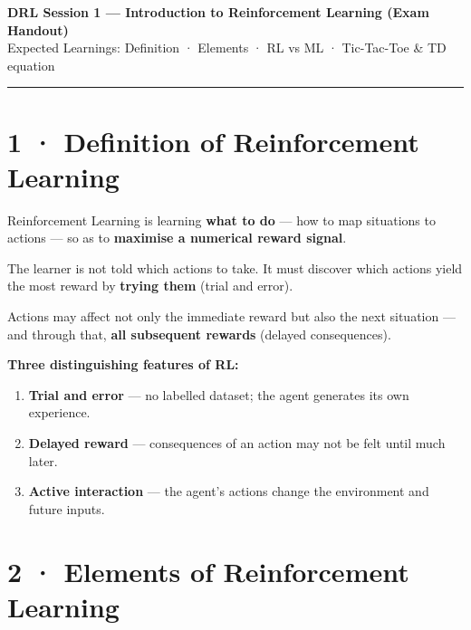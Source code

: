 \documentclass[11pt,a4paper]{article}
\begin{document}
\begin{center}
  {\large\bfseries DRL Session 1 — Introduction to Reinforcement Learning (Exam Handout)}\\[2pt]
  {\small Expected Learnings: Definition · Elements · RL vs ML · Tic-Tac-Toe \& TD equation}
\end{center}
\hrule\vspace{6pt}

\section*{1 · Definition of Reinforcement Learning}

\begin{tcolorbox}[defn={Formal Definition (Sutton \& Barto)}]
Reinforcement Learning is learning \textbf{what to do} — how to map situations to actions —
so as to \textbf{maximise a numerical reward signal}.

\medskip
The learner is not told which actions to take. It must discover which actions yield the most
reward by \textbf{trying them} (trial and error).

\medskip
Actions may affect not only the immediate reward but also the next situation — and through that,
\textbf{all subsequent rewards} (delayed consequences).
\end{tcolorbox}

\textbf{Three distinguishing features of RL:}
\begin{enumerate}
  \item \textbf{Trial and error} — no labelled dataset; the agent generates its own experience.
  \item \textbf{Delayed reward} — consequences of an action may not be felt until much later.
  \item \textbf{Active interaction} — the agent's actions change the environment and future inputs.
\end{enumerate}

\section*{2 · Elements of Reinforcement Learning}
\end{document}
